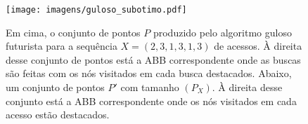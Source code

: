 \begin{comment}
        \begin{scope}[xshift=8cm] %
        \node [nodeteste] {3}
            child {node {1}
                child[missing] {}
                child {node {2}}}
            child[missing] {};
        \end{scope}
    \end{tikzpicture}
    \\
    \begin{tikzpicture}[
        level distance=1cm,
        level 1/.style={sibling distance=2cm},
        every node/.style={circle, draw=black!90, very thick, minimum size=8mm, inner sep=0pt, font=\large},
        edge from parent/.style={draw, solid, very thick},
        edge from parent path={(\tikzparentnode) -- (\tikzchildnode)},
        nodeteste/.style={circle, draw=teste, solid, minimum size=8mm, inner sep=0pt, font=\large, fill=teste!55},
        nodeBlack/.style={circle, draw=black, solid, minimum size=8mm, inner sep=0pt}
        ]
        \node [nodeteste] {3}
            child [nodeteste] {node [nodeteste] {1}
                child[missing] {}
                child [nodeBlack] {node {2}}}
            child[missing] {};
    
        \draw[->, very thick] (4,-0.5) -- (5,-0.5);
        \draw[->, very thick] (5,-1) -- (4,-1);
        \draw[->, very thick] (4,-3) -- (4,-4);
    
        \begin{scope}[xshift=8cm] %
        \node [nodeteste] {2}
            child [nodeteste] {node [nodeteste] {1}}
            child {node {3}};
        \end{scope}
    \end{tikzpicture}
    \caption{Em preto, os pontos de $P_X$ para uma sequência $X = (2,3,1,3,1,3)$ de acessos. À esquerda, o conjunto de pontos produzidos pelo Guloso futurista. À direita, o menor conjunto arboreamente satisfeito para $P_X$, de tamanho \minASS$(P_X)$.}
\label{fig:greedy_subotimo}
\end{figure}
\end{comment}

\begin{figure}
    \centering
    \texttt{[image: imagens/guloso\_subotimo.pdf]}
    \caption{Em cima, o conjunto de pontos $P$ produzido pelo algoritmo guloso futurista para a sequência $X = (2,3,1,3,1,3)$ de acessos. À direita desse conjunto de pontos está a ABB correspondente onde as buscas são feitas com os nós visitados em cada busca destacados. Abaixo, um conjunto de pontos $P'$ com tamanho \minASS$(P_X)$. À direita desse conjunto está a ABB correspondente onde os nós visitados em cada acesso estão destacados.}
\label{fig:greedy_subotimo}
\end{figure}

